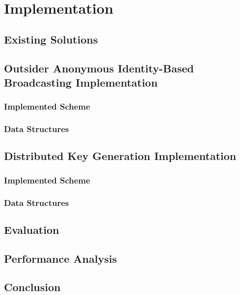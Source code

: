 \chapter{Implementation}
\label{cha:n}

\section{Existing Solutions}

\section{Outsider Anonymous Identity-Based Broadcasting Implementation}

\subsection{Implemented Scheme}

\subsection{Data Structures}

\section{Distributed Key Generation Implementation}

\subsection{Implemented Scheme}

\subsection{Data Structures}

\section{Evaluation}

\section{Performance Analysis}

\section{Conclusion}

